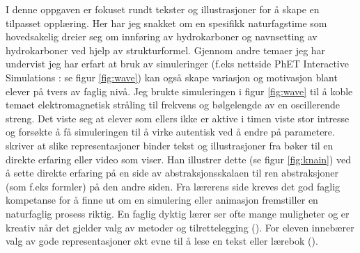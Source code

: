 \documentclass[main.tex]{subfiles}
\begin{document}
\hspace{-6mm}I denne oppgaven er fokuset rundt tekster og illustrasjoner for å skape en tilpasset opplæring. Her har jeg snakket om en spesifikk naturfagstime som hovedsakelig dreier seg om innføring av hydrokarboner og navnsetting av hydrokarboner ved hjelp av strukturformel. Gjennom andre temaer jeg har undervist jeg har erfart at bruk av simuleringer (f.eks nettside PhET Interactive Simulations : se figur \ref{fig:wave}) kan også skape variasjon og motivasjon blant elever på tvers av faglig nivå. Jeg brukte simuleringen i figur \ref{fig:wave} til å koble temaet elektromagnetisk stråling til frekvens og bølgelengde av en oscillerende streng. Det viste seg at elever som ellers ikke er aktive i timen viste stor intresse og forsøkte å få simuleringen til å virke autentisk ved å endre på parametere.\
\newline\newline
{} skriver at slike representasjoner binder tekst og illustrasjoner fra bøker til en direkte erfaring eller video som viser. Han illustrer dette (se figur \ref{fig:knain}) ved å sette direkte erfaring på en side av abstraksjonsskalaen til ren abstraksjoner (som f.eks formler) på den andre siden. Fra lærerens side kreves det god faglig kompetanse for å finne ut om en simulering eller animasjon fremstiller en naturfaglig prosess riktig. En faglig dyktig lærer ser ofte mange muligheter og er kreativ når det gjelder valg av metoder og tilrettelegging (). For eleven innebærer valg av gode representasjoner økt evne til å lese en tekst eller lærebok ().
\end{document}
